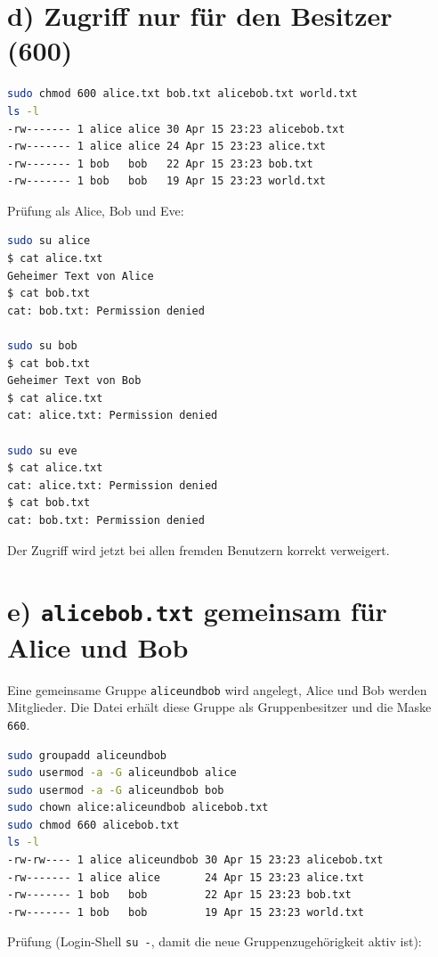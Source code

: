 \documentclass[
	fontsize=12pt,
	paper=a4,
	numbers=noenddot,
	listof=totoc,
	listof=entryprefix,
	listof=nochaptergap,
	bibliography=totoc,
	parskip=half,
	openany
]{scrbook}
\begin{document}
\section*{d) Zugriff nur für den Besitzer (600)}

\begin{lstlisting}[language=bash]
sudo chmod 600 alice.txt bob.txt alicebob.txt world.txt
ls -l
-rw------- 1 alice alice 30 Apr 15 23:23 alicebob.txt
-rw------- 1 alice alice 24 Apr 15 23:23 alice.txt
-rw------- 1 bob   bob   22 Apr 15 23:23 bob.txt
-rw------- 1 bob   bob   19 Apr 15 23:23 world.txt
\end{lstlisting}

Prüfung als Alice, Bob und Eve:

\begin{lstlisting}[language=bash]
sudo su alice
$ cat alice.txt
Geheimer Text von Alice
$ cat bob.txt
cat: bob.txt: Permission denied

sudo su bob
$ cat bob.txt
Geheimer Text von Bob
$ cat alice.txt
cat: alice.txt: Permission denied

sudo su eve
$ cat alice.txt
cat: alice.txt: Permission denied
$ cat bob.txt
cat: bob.txt: Permission denied
\end{lstlisting}

Der Zugriff wird jetzt bei allen fremden Benutzern korrekt verweigert.

\section*{e) \texttt{alicebob.txt} gemeinsam für Alice und Bob}

Eine gemeinsame Gruppe \texttt{aliceundbob} wird angelegt, Alice und Bob werden Mitglieder.
Die Datei erhält diese Gruppe als Gruppenbesitzer und die Maske \texttt{660}.

\begin{lstlisting}[language=bash]
sudo groupadd aliceundbob
sudo usermod -a -G aliceundbob alice
sudo usermod -a -G aliceundbob bob
sudo chown alice:aliceundbob alicebob.txt
sudo chmod 660 alicebob.txt
ls -l
-rw-rw---- 1 alice aliceundbob 30 Apr 15 23:23 alicebob.txt
-rw------- 1 alice alice       24 Apr 15 23:23 alice.txt
-rw------- 1 bob   bob         22 Apr 15 23:23 bob.txt
-rw------- 1 bob   bob         19 Apr 15 23:23 world.txt
\end{lstlisting}

Prüfung (Login-Shell \texttt{su -}, damit die neue Gruppenzugehörigkeit aktiv ist):
\end{document}
